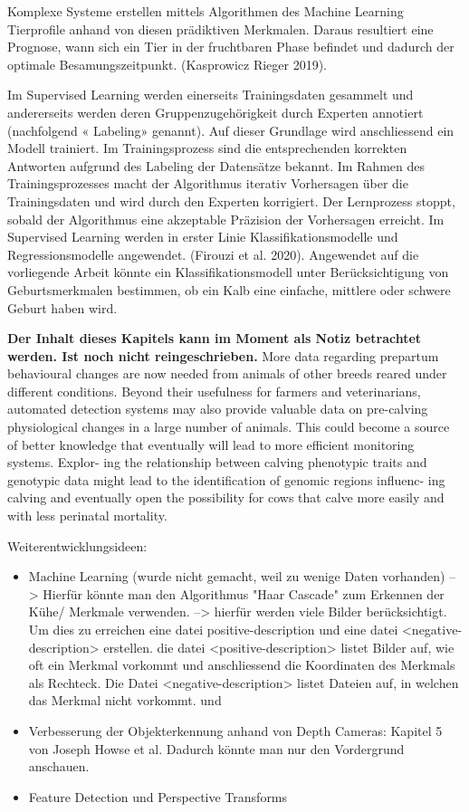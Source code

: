 Komplexe Systeme erstellen mittels Algorithmen
des Machine Learning Tierprofile anhand von diesen prädiktiven Merkmalen. Daraus
resultiert eine Prognose, wann sich ein Tier in der fruchtbaren Phase befindet
und dadurch der optimale Besamungszeitpunkt. (Kasprowicz  Rieger 2019).

Im Supervised Learning werden einerseits Trainingsdaten
gesammelt und andererseits werden deren Gruppenzugehörigkeit durch
Experten annotiert (nachfolgend « Labeling» genannt). Auf dieser Grundlage wird
anschliessend ein Modell trainiert. Im Trainingsprozess sind die entsprechenden
korrekten Antworten aufgrund des Labeling der Datensätze bekannt. Im Rahmen
des Trainingsprozesses macht der Algorithmus iterativ Vorhersagen über die Trainingsdaten
und wird durch den Experten korrigiert. Der Lernprozess stoppt, sobald
der Algorithmus eine akzeptable Präzision der Vorhersagen erreicht. Im Supervised
Learning werden in erster Linie Klassifikationsmodelle und Regressionsmodelle
angewendet. (Firouzi et al. 2020). Angewendet auf die vorliegende Arbeit könnte ein
Klassifikationsmodell unter Berücksichtigung von Geburtsmerkmalen bestimmen,
ob ein Kalb eine einfache, mittlere oder schwere Geburt haben wird.

\textbf{Der Inhalt dieses Kapitels kann im Moment als Notiz betrachtet werden. Ist noch nicht reingeschrieben.} \newline
More data regarding prepartum behavioural changes are now needed from animals of other breeds reared under different conditions. Beyond their usefulness for farmers and veterinarians, automated detection systems may also provide valuable data on pre-calving physiological changes in a large number of animals. This could become a source of better knowledge that eventually will lead to more efficient monitoring systems. Explor- ing the relationship between calving phenotypic traits and genotypic data might lead to the identification of genomic regions influenc- ing calving and eventually open the possibility for cows that calve more easily and with less perinatal mortality. \cite{Saint-Dizier2015}

Weiterentwicklungsideen: 
\begin{itemize}
	\item Machine Learning (wurde nicht gemacht, weil zu wenige Daten vorhanden) --> Hierfür könnte man den Algorithmus "Haar Cascade" zum Erkennen der Kühe/ Merkmale verwenden. --> hierfür werden viele Bilder berücksichtigt. Um dies zu erreichen eine datei positive-description und eine datei <negative-description> erstellen. die datei <positive-description> listet Bilder auf, wie oft ein Merkmal vorkommt und anschliessend die Koordinaten des Merkmals als Rechteck. Die Datei <negative-description> listet Dateien auf, in welchen das Merkmal nicht vorkommt. \citep[S. 75 ff. ]{Howse2016} und \citep[S. 139 ff. ]{Howse2016}
	\item Verbesserung der Objekterkennung anhand von Depth Cameras: Kapitel 5 von Joseph Howse et al. Dadurch könnte man nur den Vordergrund anschauen. \citep[S. 91 ff. ]{Howse2016}
	\item Feature Detection und Perspective Transforms \citep[S. 385 ff. ]{Howse2016}
\end{itemize}